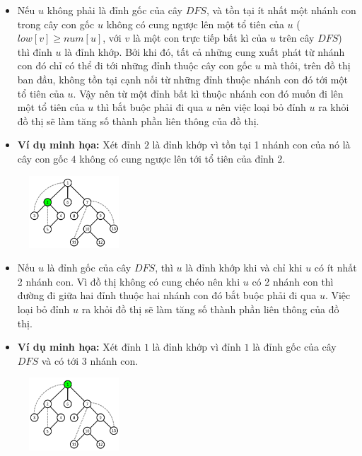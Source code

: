\documentclass{article}
\begin{document}
\begin{itemize}
    \item Nếu $u$ không phải là đỉnh gốc của cây $DFS$, và tồn tại ít nhất một nhánh con trong cây con gốc $u$ không có cung ngược lên một tổ tiên của $u$ ($low[v] \geq num[u]$, với $v$ là một con trực tiếp bất kì của $u$ trên cây $DFS$) thì đỉnh $u$ là đỉnh khớp. Bởi khi đó, tất cả những cung xuất phát từ nhánh con đó chỉ có thể đi tới những đỉnh thuộc cây con gốc $u$ mà thôi, trên đồ thị ban đầu, không tồn tại cạnh nối từ những đỉnh thuộc nhánh con đó tới một tổ tiên của $u$. Vậy nên từ một đỉnh bất kì thuộc nhánh con đó muốn đi lên một tổ tiên của $u$ thì bắt buộc phải đi qua $u$ nên việc loại bỏ đỉnh $u$ ra khỏi đồ thị sẽ làm tăng số thành phần liên thông của đồ thị.
    \item \textbf{Ví dụ minh họa:} Xét đỉnh $2$ là đỉnh khớp vì tồn tại 1 nhánh con của nó là cây con gốc $4$ không có cung ngược lên tới tổ tiên của đỉnh $2$.
\end{itemize}

\begin{figure}[h]   
    \centering
    \includegraphics[width=0.3\textwidth]{img/b4/Depth-First-Search-Tree_img8.png}
\end{figure}

\begin{itemize}
    \item Nếu $u$ là đỉnh gốc của cây $DFS$, thì $u$ là đỉnh khớp khi và chỉ khi $u$ có ít nhất 2 nhánh con. Vì đồ thị không có cung chéo nên khi $u$ có 2 nhánh con thì đường đi giữa hai đỉnh thuộc hai nhánh con đó bắt buộc phải đi qua $u$. Việc loại bỏ đỉnh $u$ ra khỏi đồ thị sẽ làm tăng số thành phần liên thông của đồ thị.
    \item \textbf{Ví dụ minh họa:} Xét đỉnh $1$ là đỉnh khớp vì đỉnh $1$ là đỉnh gốc của cây $DFS$ và có tới $3$ nhánh con.
\end{itemize}

\begin{figure}[h]   
    \centering
    \includegraphics[width=0.3\textwidth]{img/b4/Depth-First-Search-Tree_img9.png}
\end{figure}
\end{document}
